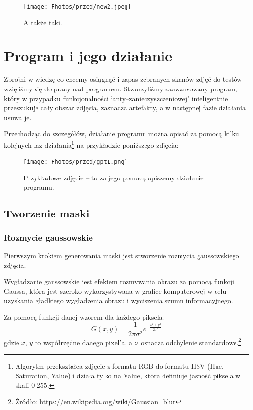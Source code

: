 \documentclass[]{mwart}
\begin{document}
\begin{figure}[H]
    \centering
    \texttt{[image: Photos/przed/new2.jpeg]}
    \caption{A także taki.}
\end{figure}

\newpage
\section{Program i jego działanie}
Zbrojni w wiedzę co chcemy osiągnąć i zapas zebranych skanów zdjęć do testów wzięliśmy się do pracy
nad programem. Stworzyliśmy zaawansowany program, który w przypadku funkcjonalności
`anty--zanieczyszczeniowej' inteligentnie przeszukuje cały obszar zdjęcia, zaznacza artefakty,
a w następnej fazie działania usuwa je.

Przechodząc do szczegółów, działanie programu można opisać za pomocą kilku kolejnych faz działania\footnote{Algorytm
    przekształca zdjęcie z formatu RGB do formatu HSV (Hue, Saturation, Value) i działa tylko na Value, która definiuje jasność piksela w skali 0-255.} na przykładzie poniższego zdjęcia:

\begin{figure}[H]
    \centering
    \texttt{[image: Photos/przed/gpt1.png]}
    \caption{Przykładowe zdjęcie -- to za jego pomocą opiszemy działanie programu.}
\end{figure}

\subsection{Tworzenie maski}
\subsubsection{Rozmycie gaussowskie}
Pierwszym krokiem generowania maski jest stworzenie rozmycia gaussowskiego zdjęcia.

Wygładzanie gaussowskie jest efektem rozmywania obrazu za pomocą funkcji Gaussa,
która jest szeroko wykorzystywana w grafice komputerowej w celu uzyskania gładkiego
wygładzenia obrazu i wyciszenia szumu informacyjnego.

Za pomocą funkcji danej wzorem dla każdego piksela:
\begin{equation}
    G(x, y) = \frac{1}{2 \pi \sigma^2}e^{- \frac{x^2+y^2}{2\sigma^2}}
\end{equation}
gdzie $x$, $y$ to współrzędne danego pixel'a, a $\sigma$ oznacza odchylenie standardowe.\footnote{Źródło: \url{https://en.wikipedia.org/wiki/Gaussian_blur}}
\end{document}
